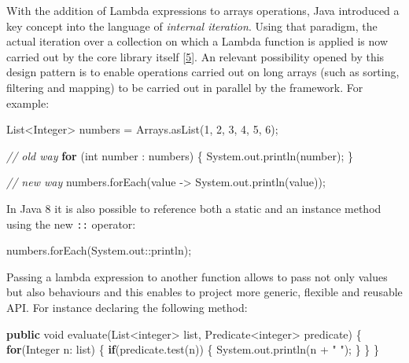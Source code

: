 \documentclass[12pt,a4paper,oneside,openright]{book}
\newenvironment{Shaded}{\begin{snugshade}}{\end{snugshade}}
\newcommand{\KeywordTok}[1]{\textcolor[rgb]{0.13,0.29,0.53}{\textbf{{#1}}}}
\newcommand{\DataTypeTok}[1]{\textcolor[rgb]{0.13,0.29,0.53}{{#1}}}
\newcommand{\DecValTok}[1]{\textcolor[rgb]{0.00,0.00,0.81}{{#1}}}
\newcommand{\StringTok}[1]{\textcolor[rgb]{0.31,0.60,0.02}{{#1}}}
\newcommand{\CommentTok}[1]{\textcolor[rgb]{0.56,0.35,0.01}{\textit{{#1}}}}
\newcommand{\FunctionTok}[1]{\textcolor[rgb]{0.00,0.00,0.00}{{#1}}}
\newcommand{\NormalTok}[1]{{#1}}
\begin{document}
With the addition of Lambda expressions to arrays operations, Java
introduced a key concept into the language of \emph{internal iteration}.
Using that paradigm, the actual iteration over a collection on which a
Lambda function is applied is now carried out by the core library itself
{[}\hyperref[ref-WhyLambda2013]{5}{]}. An relevant possibility opened by
this design pattern is to enable operations carried out on long arrays
(such as sorting, filtering and mapping) to be carried out in parallel
by the framework. For example:

\begin{Shaded}
\begin{Highlighting}[]
    \NormalTok{List<Integer> numbers = Arrays.}\FunctionTok{asList}\NormalTok{(}\DecValTok{1}\NormalTok{, }\DecValTok{2}\NormalTok{, }\DecValTok{3}\NormalTok{, }\DecValTok{4}\NormalTok{, }\DecValTok{5}\NormalTok{, }\DecValTok{6}\NormalTok{);}

    \CommentTok{// old way}
    \KeywordTok{for} \NormalTok{(}\DataTypeTok{int} \NormalTok{number : numbers) \{}
        \NormalTok{System.}\FunctionTok{out}\NormalTok{.}\FunctionTok{println}\NormalTok{(number);}
    \NormalTok{\}}

    \CommentTok{// new way}
    \NormalTok{numbers.}\FunctionTok{forEach}\NormalTok{(value -> System.}\FunctionTok{out}\NormalTok{.}\FunctionTok{println}\NormalTok{(value));}
\end{Highlighting}
\end{Shaded}

In Java 8 it is also possible to reference both a static and an instance
method using the new \texttt{::} operator:

\begin{Shaded}
\begin{Highlighting}[]
    \NormalTok{numbers.}\FunctionTok{forEach}\NormalTok{(System.}\FunctionTok{out}\NormalTok{::println);}
\end{Highlighting}
\end{Shaded}

Passing a lambda expression to another function allows to pass not only
values but also behaviours and this enables to project more generic,
flexible and reusable API. For instance declaring the following method:

\begin{Shaded}
\begin{Highlighting}[]
    \KeywordTok{public} \DataTypeTok{void} \FunctionTok{evaluate}\NormalTok{(List<integer> list,}
                         \NormalTok{Predicate<integer> predicate) \{}
        \KeywordTok{for}\NormalTok{(Integer n: list)  \{}
            \KeywordTok{if}\NormalTok{(predicate.}\FunctionTok{test}\NormalTok{(n)) \{}
                \NormalTok{System.}\FunctionTok{out}\NormalTok{.}\FunctionTok{println}\NormalTok{(n + }\StringTok{" "}\NormalTok{);}
            \NormalTok{\}}
        \NormalTok{\}}
    \NormalTok{\}}
\end{Highlighting}
\end{Shaded}
\end{document}
